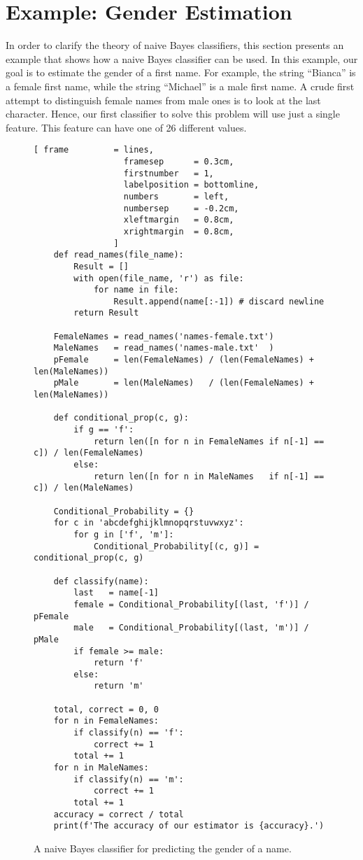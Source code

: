 \section{Example: Gender Estimation}
In order to clarify the theory of naive Bayes classifiers, this section presents an example that shows how a
naive Bayes classifier can be used.  In this example, our goal is to estimate the gender of a first name.  For
example, the string ``Bianca'' is a female first name, while the string ``Michael'' is a male first name.
A crude first attempt to distinguish female names from male ones is to look at the last character.  Hence, our
first classifier to solve this problem will use just a single feature.  This feature can have one of 26
different values.
 
\begin{figure}[!ht]
\centering
\begin{Verbatim}[ frame         = lines, 
                  framesep      = 0.3cm, 
                  firstnumber   = 1,
                  labelposition = bottomline,
                  numbers       = left,
                  numbersep     = -0.2cm,
                  xleftmargin   = 0.8cm,
                  xrightmargin  = 0.8cm,
                ]
    def read_names(file_name):
        Result = []
        with open(file_name, 'r') as file:
            for name in file:
                Result.append(name[:-1]) # discard newline
        return Result
    
    FemaleNames = read_names('names-female.txt')
    MaleNames   = read_names('names-male.txt'  )
    pFemale     = len(FemaleNames) / (len(FemaleNames) + len(MaleNames))
    pMale       = len(MaleNames)   / (len(FemaleNames) + len(MaleNames))
    
    def conditional_prop(c, g):
        if g == 'f':
            return len([n for n in FemaleNames if n[-1] == c]) / len(FemaleNames)
        else:
            return len([n for n in MaleNames   if n[-1] == c]) / len(MaleNames)
    
    Conditional_Probability = {}
    for c in 'abcdefghijklmnopqrstuvwxyz':
        for g in ['f', 'm']:
            Conditional_Probability[(c, g)] = conditional_prop(c, g)
    
    def classify(name):
        last   = name[-1]
        female = Conditional_Probability[(last, 'f')] / pFemale
        male   = Conditional_Probability[(last, 'm')] / pMale
        if female >= male:
            return 'f'
        else:
            return 'm'
        
    total, correct = 0, 0
    for n in FemaleNames:
        if classify(n) == 'f':
            correct += 1
        total += 1
    for n in MaleNames:
        if classify(n) == 'm':
            correct += 1
        total += 1
    accuracy = correct / total
    print(f'The accuracy of our estimator is {accuracy}.')
\end{Verbatim}
\vspace*{-0.3cm}
\caption{A naive Bayes classifier for predicting the gender of a name.}
\label{fig:gender_prediction.py}
\end{figure}

